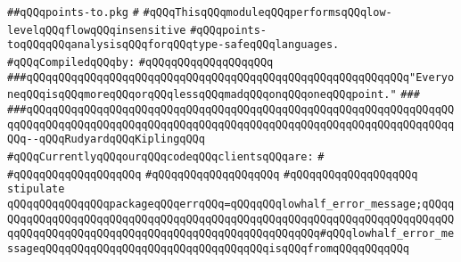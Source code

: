 \label{src/lib/compiler/back/low/aliasing/points-to.pkg}
\verb|##qQQqpoints-to.pkg|\newline
\verb|#|\newline
\verb|#qQQqThisqQQqmoduleqQQqperformsqQQqlow-levelqQQqflowqQQqinsensitive|\newline
\verb|#qQQqpoints-toqQQqqQQqanalysisqQQqforqQQqtype-safeqQQqlanguages.|\newline
\newline
\verb|#qQQqCompiledqQQqby:|\newline
\verb|#qQQqqQQqqQQqqQQqqQQq|\newline
\newline
\newline
\verb|###qQQqqQQqqQQqqQQqqQQqqQQqqQQqqQQqqQQqqQQqqQQqqQQqqQQqqQQqqQQq"EveryoneqQQqisqQQqmoreqQQqorqQQqlessqQQqmadqQQqonqQQqoneqQQqpoint."|\newline
\verb|###|\newline
\verb|###qQQqqQQqqQQqqQQqqQQqqQQqqQQqqQQqqQQqqQQqqQQqqQQqqQQqqQQqqQQqqQQqqQQqqQQqqQQqqQQqqQQqqQQqqQQqqQQqqQQqqQQqqQQqqQQqqQQqqQQqqQQqqQQqqQQqqQQqqQQq--qQQqRudyardqQQqKiplingqQQq|\newline
\newline
\newline
\newline
\verb|#qQQqCurrentlyqQQqourqQQqcodeqQQqclientsqQQqare:|\newline
\verb|#|\newline
\verb|#qQQqqQQqqQQqqQQqqQQq|\newline
\verb|#qQQqqQQqqQQqqQQqqQQq|\newline
\verb|#qQQqqQQqqQQqqQQqqQQq|\newline
\newline
\newline
\verb|stipulate|\newline
\verb|qQQqqQQqqQQqqQQqpackageqQQqerrqQQq=qQQqqQQqlowhalf_error_message;qQQqqQQqqQQqqQQqqQQqqQQqqQQqqQQqqQQqqQQqqQQqqQQqqQQqqQQqqQQqqQQqqQQqqQQqqQQqqQQqqQQqqQQqqQQqqQQqqQQqqQQqqQQqqQQqqQQqqQQqqQQq#qQQqlowhalf_error_messageqQQqqQQqqQQqqQQqqQQqqQQqqQQqqQQqqQQqisqQQqfromqQQqqQQqqQQq|\newline
